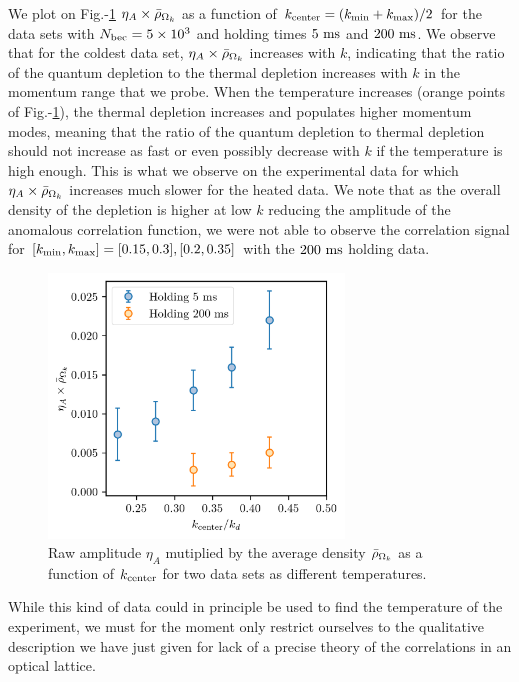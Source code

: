We plot on Fig.-\ref{fig:eta_A_vs_k} $\eta_A \times \bar{\rho}_{\Omega_k}$ as a function of $k_{\rm{center}}=(k_{\rm{min}}+k_{\rm{max}})/2$ for the data sets with $N_{\rm{bec}}= 5 \times 10^3$ and holding times $5 \ \rm{ms}$ and $200 \ \rm{ms}$. We observe that for the coldest data set, $\eta_A \times \bar{\rho}_{\Omega_k}$ increases with $k$, indicating that the ratio of the quantum depletion to the thermal depletion increases with $k$ in the momentum range that we probe. When the temperature increases (orange points of Fig.-\ref{fig:eta_A_vs_k}), the thermal depletion increases and populates higher momentum modes, meaning that the ratio of the quantum depletion to thermal depletion should not increase as fast or even possibly decrease with $k$ if the temperature is high enough. This is what we observe on the experimental data for which $\eta_A \times \bar{\rho}_{\Omega_k}$ increases much slower for the heated data. We note that as the overall density of the depletion is higher at low $k$ reducing the amplitude of the anomalous correlation function, we were not able to observe the correlation signal for $[k_{\rm{min}},k_{\rm{max}}]=[0.15,0.3],[0.2,0.35]$ with the $200 \ \rm{ms}$ holding data.

\begin{figure}
    \centering
    \includegraphics[width=0.7\textwidth]{Fig/Chapter4/eta_A_vs_k.png}
    \caption[Evolution of the anomalous correlations amplitudes with $k$]{Raw amplitude $\eta_A$ mutiplied by the average density $\bar{\rho}_{\Omega_k}$ as a function of $k_{\rm{center}}$ for two data sets as different temperatures.}
    \label{fig:eta_A_vs_k}
\end{figure}

While this kind of data could in principle be used to find the temperature of the experiment, we must for the moment only restrict ourselves to the qualitative description we have just given for lack of a precise theory of the correlations in an optical lattice.

